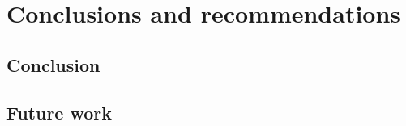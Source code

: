 \documentclass[11pt,twoside]{ce}
\begin{document}
\chapter{Conclusions and recommendations}
\label{chap:ccl}


\section{Conclusion}


\section{Future work}		


\cleardoublepage
%
%
%       
\RaggedRight
\printbibliography


%    

\cleardoublepage

\end{document}
